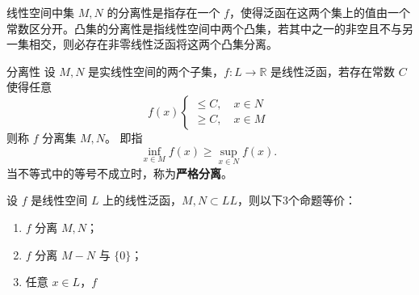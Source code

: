 

线性空间中集 $M,N$ 的分离性是指存在一个 $f$，使得泛函在这两个集上的值由一个常数区分开。凸集的分离性是指线性空间中两个凸集，若其中之一的非空且不与另一集相交，则必存在非零线性泛函将这两个凸集分离。

\begin{definition}{分离性}
设 $M,N$ 是实线性空间的两个子集，$f:L\rightarrow\mathbb R$ 是线性泛函，若存在常数 $C$ 使得任意 
\begin{equation}
f(x)\left\{\begin{aligned}\leq C,\quad x\in N\\
\geq C,\quad x\in M
\end{aligned}\right.~
\end{equation}
则称 $f$ 分离集 $M,N$。
即指
\begin{equation}
\inf_{x\in M}f(x)\geq\sup_{x\in N}f(x).~
\end{equation}
当不等式中的等号不成立时，称为\textbf{严格分离}。
\end{definition}

\begin{theorem}{}
设 $f$ 是线性空间 $L$ 上的线性泛函，$M,N\subset LL$，则以下3个命题等价：
\begin{enumerate}
\item $f$ 分离 $M,N$；
\item $f$ 分离 $M-N$ 与 $\{0\}$；
\item 任意 $x\in L$，$f$
\end{enumerate}
\end{theorem}
